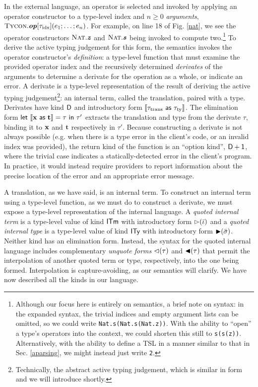 \documentclass[9pt,preprint]{sigplanconf}
\begin{document}
In the external language, an operator is selected and invoked by applying an operator constructor to a type-level index and $n \geq 0$ \emph{arguments}, ${\textsc{Tycon}.\textbf{\textit{op}}[{\tau_{\text{idx}}}](e_{1};\ldots;e_{n})}$. For example, on line 18 of Fig. \ref{nat}, we see the operator constructors $\textsc{Nat}.\textbf{\textit{z}}$ and $\textsc{Nat}.\textbf{\textit{s}}$ being invoked to compute two.\footnote{Although our focus here is entirely on semantics, a brief note on syntax: in the expanded syntax, the trivial indices and empty argument lists can be omitted, so we could write \texttt{Nat.s(Nat.s(Nat.z))}. With the ability to ``open'' a type's operators into the context, we could shorten this still to \texttt{s(s(z))}. Alternatively, with the ability to define a TSL in a manner similar to that in Sec. \ref{aparsing}, we might instead just write \texttt{2}.}
To derive the active typing judgement for this form, the semantics invokes  
 the operator constructor's  \emph{definition}: a type-level function that must examine the provided operator index and the recursively determined \emph{derivates} of the arguments to determine a derivate for the operation as a whole,  or indicate an error. A derivate is a type-level representation of the result of deriving the active typing judgement\footnote{Technically, the abstract active typing judgement, which is similar in form and we will introduce shortly.}: an internal term, called the {translation},  paired with a type. Derivates have kind $\textsf{D}$ and introductory form $\llbracket {\tau_{\text{trans}}}~{\sf as}~{\tau_{\text{ty}}} \rrbracket$. The elimination form ${\sf let}~\llbracket {\textbf{x}}~{\sf as}~{\textbf{t}} \rrbracket=\tau~{\sf in}~\tau'$ extracts the translation and type from the derivate $\tau$, binding it to ${\textbf{x}}$ and ${\textbf{t}}$ respectively in $\tau'$. 
Because constructing a derivate is not always possible (e.g. when there is a type error in the client's code, or an invalid index was provided), the return kind of the function is an ``option kind'', $\textsf{D} + \textsf{1}$, where the trivial case indicates a statically-detected error in the client's program. In practice, it would instead require providers to report information about the precise location of the error and an appropriate error message.
 
A translation, as we have said, is an internal term. To construct an internal term using a type-level function, as we must do to construct a derivate, we must expose a type-level representation of the internal language. A \emph{quoted internal term} is a type-level value of kind $\textsf{ITm}$ with introductory form $\rhd(\bar \iota)$ and a \emph{quoted internal type} is a type-level value of kind $\textsf{ITy}$ with introductory form ${\blacktriangleright}(\bar \sigma)$. Neither kind has an elimination form. Instead, the syntax for the quoted  internal language includes complementary \emph{unquote forms} ${\lhd}(\tau)$ and ${\blacktriangleleft}(\tau)$ that permit the interpolation of another quoted term or type, respectively, into the one being formed. Interpolation is capture-avoiding, as our semantics will clarify. We have now described all the kinds in our language.
\end{document}
